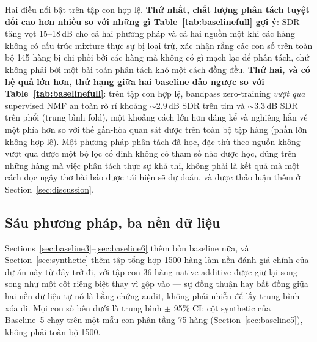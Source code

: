 \documentclass[11pt]{article}
\begin{document}
Hai điều nổi bật trên tập con hợp lệ. \textbf{Thứ nhất, chất lượng phân
tách tuyệt đối cao hơn nhiều so với những gì Table~\ref{tab:baselinefull}
gợi ý}: SDR tăng vọt 15--18\,dB cho cả hai phương pháp và cả hai nguồn
một khi các hàng không có cấu trúc mixture thực sự bị loại trừ, xác nhận
rằng các con số trên toàn bộ 145 hàng bị chi phối bởi các hàng mà không
có gì mạch lạc để phân tách, chứ không phải bởi một bài toán phân tách
khó một cách đồng đều. \textbf{Thứ hai, và có hệ quả lớn hơn, thứ hạng
giữa hai baseline đảo ngược so với Table~\ref{tab:baselinefull}}: trên
tập con hợp lệ, bandpass zero-training \emph{vượt qua} supervised NMF an
toàn rò rỉ khoảng $\sim$2.9\,dB SDR trên tim và $\sim$3.3\,dB SDR trên
phổi (trung bình fold), một khoảng cách lớn hơn đáng kể và nghiêng hẳn về một phía hơn so
với thế gần-hòa quan sát được trên toàn bộ tập hàng (phần lớn không hợp
lệ). Một phương pháp phân tách đã học, đặc thù theo nguồn không vượt qua
được một bộ lọc cố định không có tham số nào được học, đúng trên những
hàng mà việc phân tách thực sự khả thi, không phải là kết quả mà một
cách đọc ngây thơ bài báo được tái hiện sẽ dự đoán, và được thảo luận
thêm ở Section~\ref{sec:discussion}.

\subsection{Sáu phương pháp, ba nền dữ liệu}
\label{sec:sixmethod}

Sections~\ref{sec:baseline3}--\ref{sec:baseline6} thêm bốn baseline nữa,
và Section~\ref{sec:synthetic} thêm tập tổng hợp 1500 hàng làm nền đánh
giá chính của dự án này từ đây trở đi, với tập con 36 hàng native-additive
được giữ lại song song như một cột riêng biệt thay vì gộp vào --- sự
đồng thuận hay bất đồng giữa hai nền dữ liệu tự nó là bằng chứng audit,
không phải nhiễu để lấy trung bình xóa đi. Mọi con số bên dưới là trung
bình $\pm$ 95\% CI; cột synthetic của Baseline~5 chạy trên một mẫu con
phân tầng 75 hàng (Section~\ref{sec:baseline5}), không phải toàn bộ 1500.
\end{document}
